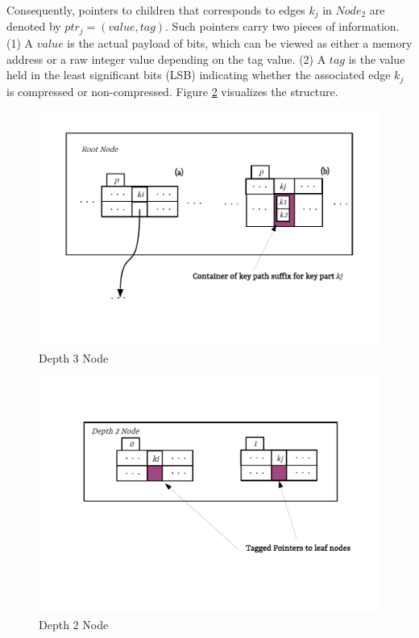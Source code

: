 Consequently, pointers to children that corresponds to edges $k_{j}$ in $Node_{2}$ are denoted by $ptr_{j} = (value, tag)$. Such pointers carry two pieces of information. (1) A $value$ is the actual payload of bits, which can be viewed as either a memory address or a raw integer value depending on the tag value. (2) A $tag$ is the value held in the least significant bits (LSB) indicating whether the associated edge $k_{j}$ is compressed or non-compressed. Figure \ref{fig:compressed_depth_2_node} visualizes the structure.

\clearpage
\begin{figure}
	\centering
	\vspace{-0.3in}
	\includegraphics{figures/chapter4/depth3}
	\caption{Depth 3 Node}
	\label{fig:compressed_depth_3_node}
\end{figure}

\begin{figure}
	\centering
	\vspace{-1in}
	\includegraphics{figures/chapter4/depth2}
	\caption{Depth 2 Node}
	\label{fig:compressed_depth_2_node}
\end{figure}
\clearpage
